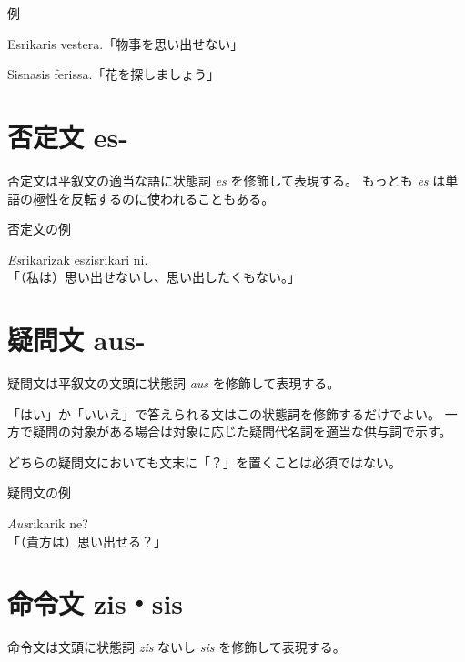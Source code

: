 \begin{itembox}[l]{例}
    \begin{pindent}
        \noindent
        Esrikaris vestera.「物事を思い出せない」

        \noindent
        Sisnasis ferissa.「花を探しましょう」
    \end{pindent}
\end{itembox}

\section{否定文 es-}

否定文は平叙文の適当な語に状態詞 \emph{es} を修飾して表現する。
もっとも \emph{es} は単語の極性を反転するのに使われることもある。

\begin{itembox}[l]{否定文の例}
    \begin{pindent}
        \noindent
        \emph{Es}rikarizak eszisrikari ni. \\
        「（私は）思い出せないし、思い出したくもない。」
    \end{pindent}
\end{itembox}

\section{疑問文 aus-}

疑問文は平叙文の文頭に状態詞 \emph{aus} を修飾して表現する。

「はい」か「いいえ」で答えられる文はこの状態詞を修飾するだけでよい。
一方で疑問の対象がある場合は対象に応じた疑問代名詞を適当な供与詞で示す。

どちらの疑問文においても文末に「？」を置くことは必須ではない。

\begin{itembox}[l]{疑問文の例}
    \begin{pindent}
        \noindent
        \emph{Aus}rikarik ne? \\
        「（貴方は）思い出せる？」
    \end{pindent}
\end{itembox}

\section{命令文 zis・sis}

命令文は文頭に状態詞 \emph{zis} ないし \emph{sis} を修飾して表現する。

